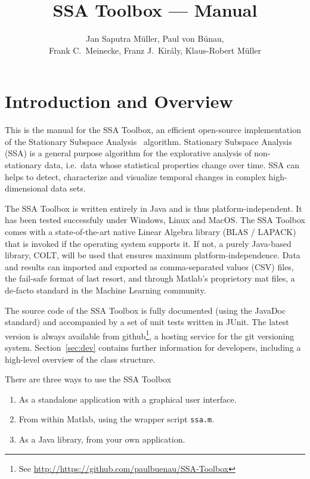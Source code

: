 \documentclass{article}
\newcommand{\1}{\ensuremath{\mathds{1}}}
\newcommand{\0}{\ensuremath{0}}
\begin{document}
\title{SSA Toolbox  --- Manual}
\author{Jan Saputra M\"uller, Paul von B\"unau, \\ Frank C.~Meinecke, Franz J.~Kir\'{a}ly, Klaus-Robert M\"uller}

\maketitle

\tableofcontents

\newpage

\section{Introduction and Overview}

This is the manual for the SSA Toolbox, an efficient open-source implementation of the 
Stationary Subspace Analysis~\cite{PRL:SSA:2009} algorithm. Stationary Subspace Analysis (SSA)
is a general purpose algorithm for the explorative analysis of non-stationary data, i.e.~data
whose statistical properties change over time. SSA can helps to detect, characterize and 
visualize temporal changes in complex high-dimensional data sets.

The SSA Toolbox is written entirely in Java and is thus platform-independent. It has been tested
successfuly under Windows, Linux and MacOS. The SSA Toolbox comes with a state-of-the-art native 
Linear Algebra library (BLAS / LAPACK) that is invoked if the operating system supports 
it. If not, a purely Java-based library, COLT, will be used that ensures maximum platform-independence. 
Data and results can imported and exported as comma-separated values (CSV) files, the fail-safe 
format of last resort, and through Matlab's proprietory mat files, a de-facto standard in the 
Machine Learning community.

The source code of the SSA Toolbox is fully documented (using the JavaDoc standard) and accompanied
by a set of unit tests written in JUnit. The latest version is always available from 
github\footnote{See \url{http://https://github.com/paulbuenau/SSA-Toolbox}}, a hosting service for
the git versioning system. Section~\ref{sec:dev} contains further information for developers, 
including a high-level overview of the class structure.
 
There are three ways to use the SSA Toolbox
\begin{enumerate}
	\item As a standalone application with a graphical user interface. 
	 
	\item From within Matlab, using the wrapper script \texttt{ssa.m}. 

	\item As a Java library, from your own application.
\end{enumerate}
\end{document}
